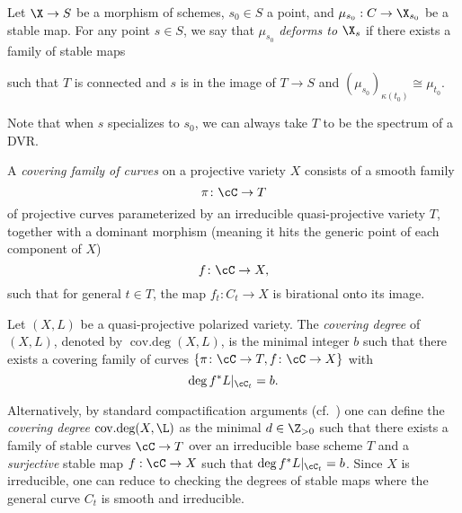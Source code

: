 \documentclass[12pt]{article}
\DeclareMathOperator{\covdeg}{\text{cov.deg}}
\theoremstyle{plain}
\begin{document}
\begin{defn} \label{def:deforms}
    Let $\X \to S$ be a morphism of schemes, $s_0 \in S$ a point, and $\mu_{s_0} : C \to \X_{s_0}$ be a stable map. For any point $s\in S$, we say that $\mu_{s_0}$ \textit{deforms to $\X_{s}$} if there exists a family of stable maps
    \begin{center}
    \end{center}
    such that $T$ is connected and $s$ is in the image of $T \to S$ and $(\mu_{s_0})_{\kappa(t_0)} \cong \mu_{t_0}$. 
\end{defn}

\noindent Note that when $s$ specializes to $s_{0}$, we can always take $T$ to be the spectrum of a DVR.

\begin{defn}
    A \textit{covering family of curves} on a projective variety $X$ consists of a smooth family
    \[ \pi \colon \cC \rightarrow T \]
    of projective curves parameterized by an irreducible quasi-projective variety $T$, together with a dominant morphism (meaning it hits the generic point of each component of $X$)
    \[ f \colon \cC \rightarrow X, \]
    such that for general $t \in T$, the map $f_{t} \colon C_{t} \rightarrow X$ is birational onto its image.
\end{defn}


\begin{defn}\label{def:covdeg}
 Let $(X, L)$ be a quasi-projective polarized variety. The \textit{covering degree} of $(X, L)$, denoted by $\covdeg(X, L)$, is the minimal integer $b$ such that there exists a covering family of curves $\{ \pi \colon \cC \to T, f \colon \cC \rightarrow X \}$ with
    \[ \deg{f^* L|_{\cC_t}} = b. \]
\end{defn}

\begin{remark}\label{rem:defcovdeg}
Alternatively, by standard compactification arguments (cf.\ \cite[Prop 2.6]{Vis89}) one can define the \textit{covering degree} $\covdeg(X, \L)$ as the minimal $d \in \Z_{>0}$ such that there exists a family of stable curves $\cC \to T$ over an irreducible base scheme $T$ and a \emph{surjective} stable map $f : \cC \to X$ such that $\deg{f^* L|_{\cC_t}} = b$. Since $X$ is irreducible, one can reduce to checking the degrees of stable maps where the general curve $C_{t}$ is smooth and irreducible.
\end{remark}
\end{document}
